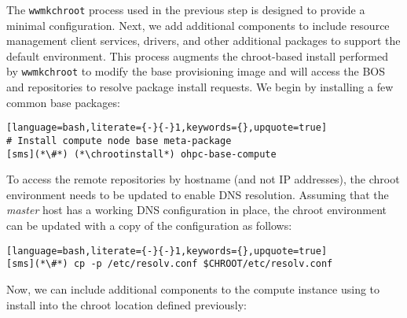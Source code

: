 The \texttt{wwmkchroot} process used in the previous step is designed to
provide a minimal \baseOS{} configuration. Next, we add additional components
to include resource management client services, \InfiniBand{} drivers, and
other additional packages to support the default \OHPC{} environment. This
process augments the chroot-based install performed by \texttt{wwmkchroot} to
modify the base provisioning image and will access the BOS and \OHPC{}
repositories to resolve package install requests. We begin by installing a few
common base packages:

\begin{lstlisting}[language=bash,literate={-}{-}1,keywords={},upquote=true]
# Install compute node base meta-package
[sms](*\#*) (*\chrootinstall*) ohpc-base-compute
\end{lstlisting}

To access the remote
repositories by hostname (and not IP addresses), the chroot environment needs
to be updated to enable DNS resolution. Assuming that the {\em master} host has
a working DNS configuration in place, the chroot environment can be updated
with a copy of the configuration as follows:

\begin{lstlisting}[language=bash,literate={-}{-}1,keywords={},upquote=true]
[sms](*\#*) cp -p /etc/resolv.conf $CHROOT/etc/resolv.conf
\end{lstlisting}

\noindent Now, we can include additional components to the compute instance using
\texttt{\pkgmgr{}} to install into the chroot location defined previously:
